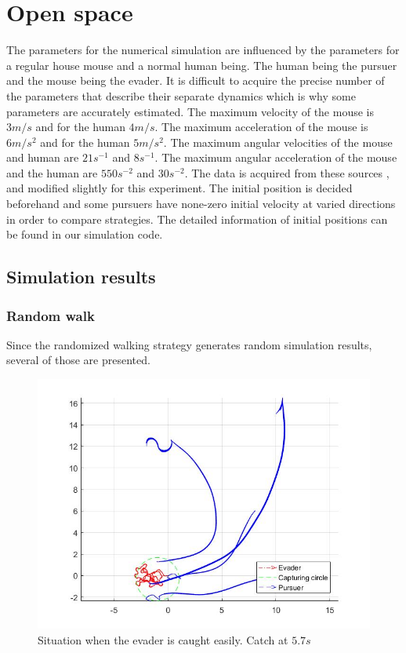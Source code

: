 \documentclass[ebook,11pt] {kth-mag}
\begin{document}
\section{Open space}
The parameters for the numerical simulation are influenced by the parameters for a regular house mouse and a normal human being. The human being the pursuer and the mouse being the evader. It is difficult to acquire the precise number of the parameters that describe their separate dynamics which is why some parameters are accurately estimated. 
The maximum velocity of the mouse is $3 m/s$ and for the human $4 m/s$. The maximum acceleration of the mouse is $6 m/s^2$ and for the human $5 m/s^2$. The maximum angular velocities of the mouse and human are $21 s^{-1}$ and $8 s^{-1}$. The maximum angular acceleration of the mouse and the human are $550 s^{-2}$ and $30 s^{-2}$. The data is acquired from these sources \cite{kinhuman}, \cite{kinmouse} and modified slightly for this experiment. 
The initial position is decided beforehand and some pursuers have none-zero initial velocity at varied directions in order to compare strategies. The detailed information of initial positions can be found in our simulation code. \cite{code}

\subsection{Simulation results}
\subsubsection{Random walk}
Since the randomized walking strategy generates random simulation results, several of those are presented. 

\begin{figure}[H]
\centering
\includegraphics[scale=0.35]{open_random_easy}
\caption{Situation when the evader is caught easily. Catch at $5.7 s$}
\end{figure}
\end{document}
